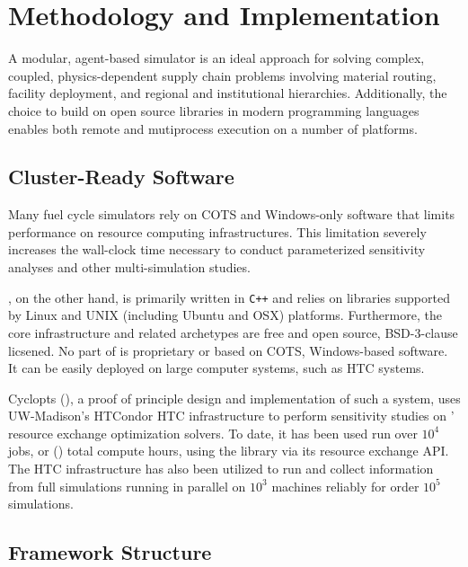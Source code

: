 \section{Methodology and Implementation}

A modular, agent-based simulator is an ideal approach for solving complex, coupled,
physics-dependent supply chain problems involving material routing, facility
deployment, and regional and institutional hierarchies. Additionally, the choice to 
build \Cyclus on open source libraries in modern programming languages enables 
both remote and mutiprocess execution on a number of platforms.

\subsection{Cluster-Ready Software}

Many fuel cycle simulators rely on \gls{COTS} and Windows-only software that limits 
performance on resource computing infrastructures. This limitation severely 
increases the wall-clock time necessary to conduct parameterized sensitivity 
analyses and other multi-simulation studies. 

\Cyclus, on the other hand, is primarily written in \texttt{C++} and relies on 
libraries supported by Linux and UNIX (including Ubuntu and OSX) platforms. 
Furthermore, the core infrastructure and related archetypes are free and 
open source, BSD-3-clause licsened. No part of \Cyclus is proprietary or based 
on \gls{COTS}, Windows-based software. It can be easily deployed 
on large computer systems, such as \gls{HTC} systems.

Cyclopts (), a proof of principle design and implementation of such a
system, uses UW-Madison's HTCondor \gls{HTC} infrastructure to perform sensitivity
studies on \Cyclus' resource exchange optimization solvers. To date, it has been
used run over $10^4$ jobs, or () total compute hours, using
the \Cyclus library via its resource exchange \gls{API}.
The \gls{HTC} infrastructure has also been utilized to run and collect
information from full \Cyclus simulations running in parallel on $10^3$
machines reliably for order $10^5$ simulations.


\subsection{Framework Structure}

